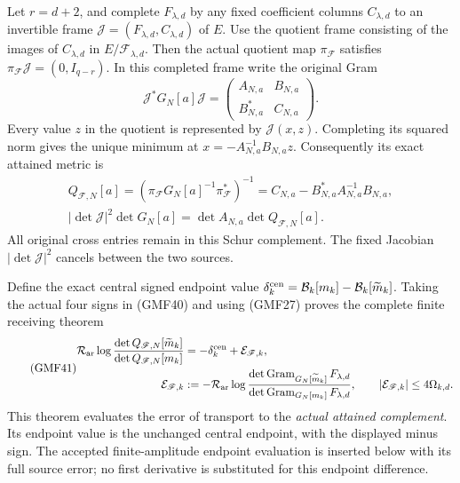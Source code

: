 \documentclass[11pt]{article}
\newcommand{\Fcal}{\mathscr F}
\newcommand{\Bcal}{\mathcal B}
\DeclareMathOperator{\Gram}{Gram}
\begin{document}
Let \(r=d+2\), and complete \(F_{\lambda,d}\) by any fixed
coefficient columns \(C_{\lambda,d}\) to an invertible frame
\(\mathcal J=(F_{\lambda,d},C_{\lambda,d})\) of \(E\).
Use the quotient frame consisting of the images of
\(C_{\lambda,d}\) in \(E/\Fcal_{\lambda,d}\).
Then the actual quotient map \(\pi_\Fcal\) satisfies
\(\pi_\Fcal\mathcal J=(0,I_{q-r})\).
In this completed frame write the original Gram
\[
 \mathcal J^*G_N[a]\mathcal J=
 \begin{pmatrix}A_{N,a}&B_{N,a}\\B_{N,a}^*&C_{N,a}\end{pmatrix}.
\]
Every value \(z\) in the quotient is represented by
\(\mathcal J(x,z)\).  Completing its squared norm gives
the unique minimum at \(x=-A_{N,a}^{-1}B_{N,a}z\).
Consequently its exact attained metric is
\begin{equation}\tag{GMF40}
\begin{gathered}
 Q_{\Fcal,N}[a]
 =(\pi_\Fcal G_N[a]^{-1}\pi_\Fcal^*)^{-1}
 =C_{N,a}-B_{N,a}^*A_{N,a}^{-1}B_{N,a},\\
 |\det\mathcal J|^2\det G_N[a]
   =\det A_{N,a}\det Q_{\Fcal,N}[a].
\end{gathered}
\end{equation}
All original cross entries remain in this Schur complement.
The fixed Jacobian \(|\det\mathcal J|^2\) cancels between
the two sources.

Define the exact central signed endpoint value
\(\delta_k^{\rm cen}=\Bcal_k[m_k]-\Bcal_k[\widetilde m_k]\).
Taking the actual four signs in (GMF40) and using (GMF27)
proves the complete finite receiving theorem
\begin{equation}\tag{GMF41}
\begin{split}
 \mathcal R_{\rm ar}
 \log\frac{\det Q_{\Fcal,N}[\widetilde m_k]}
              {\det Q_{\Fcal,N}[m_k]}
 &=-\delta_k^{\rm cen}+\mathcal E_{\Fcal,k},\\
 \mathcal E_{\Fcal,k}
 &:=-\mathcal R_{\rm ar}
 \log\frac{\det\Gram_{G_N[\widetilde m_k]}F_{\lambda,d}}
              {\det\Gram_{G_N[m_k]}F_{\lambda,d}},
 \qquad |\mathcal E_{\Fcal,k}|\le4\Omega_{k,d}.
\end{split}
\end{equation}
This theorem evaluates the error of transport to the
\emph{actual attained complement}.  Its endpoint value is
the unchanged central endpoint, with the displayed minus
sign.  The accepted finite-amplitude endpoint evaluation is
inserted below with its full source error; no first
derivative is substituted for this endpoint difference.
\end{document}
